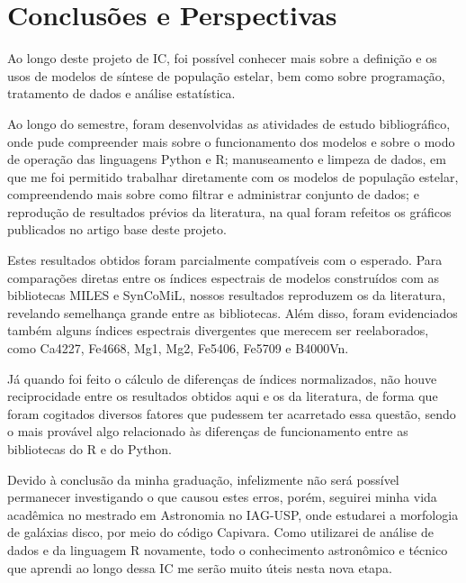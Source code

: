 \documentclass[12pt]{projeto}
\begin{document}
\section{Conclusões e Perspectivas}

Ao longo deste projeto de IC, foi possível conhecer mais sobre a definição e os usos de modelos de síntese de população estelar, bem como sobre programação, tratamento de dados e análise estatística.

Ao longo do semestre, foram desenvolvidas as atividades de estudo bibliográfico, onde pude compreender mais sobre o funcionamento dos modelos e sobre o modo de operação das linguagens Python e R; manuseamento e limpeza de dados, em que me foi permitido trabalhar diretamente com os modelos de população estelar, compreendendo mais sobre como filtrar e administrar conjunto de dados; e reprodução de resultados prévios da literatura, na qual foram refeitos os gráficos publicados no artigo base deste projeto.

Estes resultados obtidos foram parcialmente compatíveis com o esperado. Para comparações diretas entre os índices espectrais de modelos construídos com as bibliotecas MILES e SynCoMiL, nossos resultados reproduzem os da literatura, revelando semelhança grande entre as bibliotecas. Além disso, foram evidenciados também alguns índices espectrais divergentes que merecem ser reelaborados, como Ca4227, Fe4668, Mg1, Mg2, Fe5406, Fe5709 e B4000Vn.

Já quando foi feito o cálculo de diferenças de índices normalizados, não houve reciprocidade entre os resultados obtidos aqui e os da literatura, de forma que foram cogitados diversos fatores que pudessem ter acarretado essa questão, sendo o mais provável algo relacionado às diferenças de funcionamento entre as bibliotecas do R e do Python.

Devido à conclusão da minha graduação, infelizmente não será possível permanecer investigando o que causou estes erros, porém, seguirei minha vida acadêmica no mestrado em Astronomia no IAG-USP, onde estudarei a morfologia de galáxias disco, por meio do código Capivara. Como utilizarei de análise de dados e da linguagem R novamente, todo o conhecimento astronômico e técnico que aprendi ao longo dessa IC me serão muito úteis nesta nova etapa. 



\begin{thebibliography}{99}
\end{thebibliography}
\end{document}
